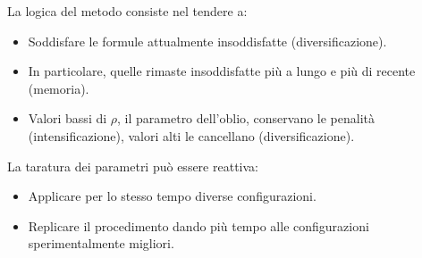 \documentclass[\main/main.tex]{subfiles}
\begin{document}
\begin{multicols}{2}
\begin{observation}
    La logica del metodo consiste nel tendere a:
    \begin{itemize}
        \item Soddisfare le formule attualmente insoddisfatte (diversificazione).
        \item In particolare, quelle rimaste insoddisfatte più a lungo e più di recente (memoria).
        \item Valori bassi di \(\rho\), il parametro dell'oblio, conservano le penalità (intensificazione), valori alti le cancellano (diversificazione).
    \end{itemize}
\end{observation}
\begin{observation}
    La taratura dei parametri può essere reattiva:
    \begin{itemize}
        \item Applicare per lo stesso tempo diverse configurazioni.
        \item Replicare il procedimento dando più tempo alle configurazioni sperimentalmente migliori.
    \end{itemize}
\end{observation}
\end{multicols}
\end{document}
